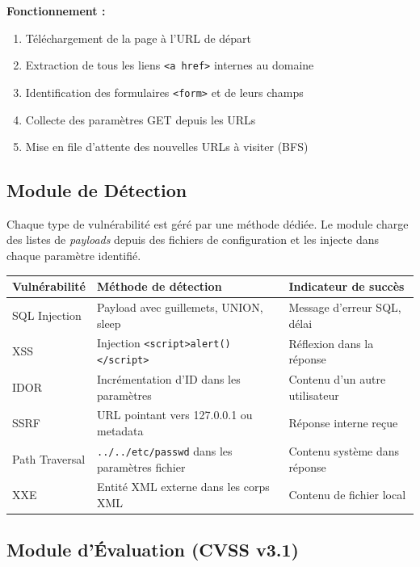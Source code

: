 \documentclass[12pt, a4paper]{report}
\begin{document}
\textbf{Fonctionnement :}
\begin{enumerate}[leftmargin=2em, itemsep=3pt]
  \item Téléchargement de la page à l'URL de départ
  \item Extraction de tous les liens \texttt{<a href>} internes au domaine
  \item Identification des formulaires \texttt{<form>} et de leurs champs
  \item Collecte des paramètres GET depuis les URLs
  \item Mise en file d'attente des nouvelles URLs à visiter (BFS)
\end{enumerate}

\subsection{Module de Détection}

Chaque type de vulnérabilité est géré par une méthode dédiée. Le module charge
des listes de \textit{payloads} depuis des fichiers de configuration et les injecte
dans chaque paramètre identifié.

\begin{center}
\begin{tabular}{l >{\raggedright\arraybackslash}p{5cm} >{\raggedright\arraybackslash}p{4cm}}
  \toprule
  \textbf{Vulnérabilité} & \textbf{Méthode de détection} & \textbf{Indicateur de succès} \\
  \midrule
  SQL Injection & Payload avec guillemets, UNION, sleep & Message d'erreur SQL, délai \\
  XSS           & Injection \texttt{<script>alert()</script>} & Réflexion dans la réponse \\
  IDOR          & Incrémentation d'ID dans les paramètres & Contenu d'un autre utilisateur \\
  SSRF          & URL pointant vers 127.0.0.1 ou metadata & Réponse interne reçue \\
  Path Traversal& \texttt{../../etc/passwd} dans les paramètres fichier & Contenu système dans réponse \\
  XXE           & Entité XML externe dans les corps XML & Contenu de fichier local \\
  \bottomrule
\end{tabular}
\end{center}

\subsection{Module d'Évaluation (CVSS v3.1)}
\end{document}
